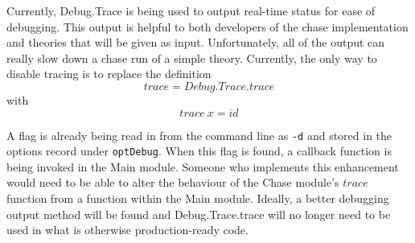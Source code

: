 			Currently, Debug.Trace is being used to output real-time status for
			ease of debugging. This output is helpful to both developers of
			the chase implementation and theories that will be given as input.
			Unfortunately, all of the output can really slow down a chase run
			of a simple theory. Currently, the only way to disable tracing is
			to replace the definition \[trace = Debug.Trace.trace\] with
			\[trace\ x = id\]

			A flag is already being read in from the command line as {\tt -d}
			and stored in the options record under {\tt optDebug}. When this
			flag is found, a callback function is being invoked in the Main
			module. Someone who implements this enhancement would need to be
			able to alter the behaviour of the Chase module's $trace$ function
			from a function within the Main module. Ideally, a better
			debugging output method will be found and Debug.Trace.trace will no
			longer need to be used in what is otherwise production-ready code.
